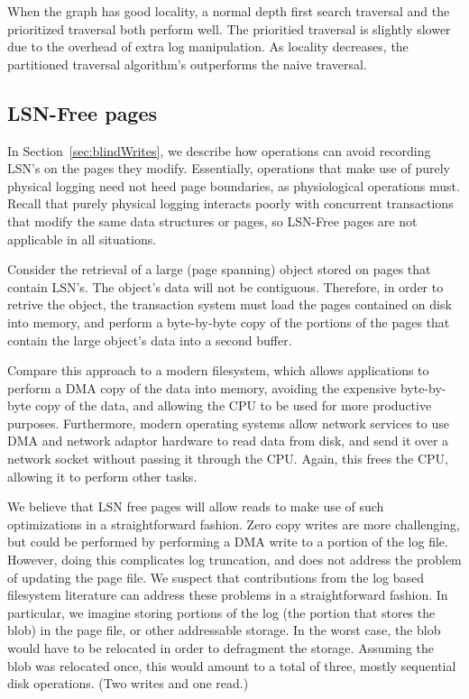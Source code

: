 \documentclass[letterpaper,twocolumn,10pt]{article}
\begin{document}
When the graph has good locality, a normal depth first search
traversal and the prioritized traversal both perform well.  The
prioritied traversal is slightly slower due to the overhead of extra
log manipulation. As locality decreases, the partitioned traversal
algorithm's outperforms the naive traversal.


\subsection{LSN-Free pages}
\label{sec:zeroCopy}
In Section~\ref{sec:blindWrites}, we describe how operations can avoid recording
LSN's on the pages they modify.  Essentially, operations that make use
of purely physical logging need not heed page boundaries, as
physiological operations must.  Recall that purely physical logging
interacts poorly with concurrent transactions that modify the same
data structures or pages, so LSN-Free pages are not applicable in all
situations.

Consider the retrieval of a large (page spanning) object stored on
pages that contain LSN's.  The object's data will not be contiguous.
Therefore, in order to retrive the object, the transaction system must
load the pages contained on disk into memory, and perform a byte-by-byte copy of the
portions of the pages that contain the large object's data into a second buffer.  

Compare
this approach to a modern filesystem, which allows applications to
perform a DMA copy of the data into memory, avoiding the expensive
byte-by-byte copy of the data, and allowing the CPU to be used for
more productive purposes.  Furthermore, modern operating systems allow
network services to use DMA and network adaptor hardware to read data
from disk, and send it over a network socket without passing it
through the CPU.  Again, this frees the CPU, allowing it to perform
other tasks.

We believe that LSN free pages will allow reads to make use of such
optimizations in a straightforward fashion.  Zero copy writes are more challenging, but could be
performed by performing a DMA write to a portion of the log file.
However, doing this complicates log truncation, and does not address
the problem of updating the page file.  We suspect that contributions
from the log based filesystem literature can address these problems in
a straightforward fashion.  In particular, we imagine storing 
portions of the log (the portion that stores the blob) in the 
page file, or other addressable storage.  In the worst case, 
the blob would have to be relocated in order to defragment the 
storage.  Assuming the blob was relocated once, this would amount 
to a total of three, mostly sequential disk operations.  (Two 
writes and one read.)  
\end{document}
